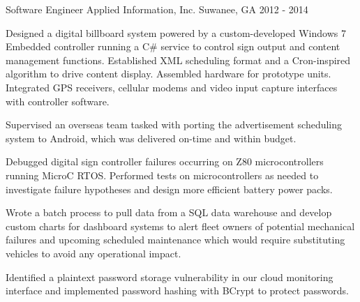 \begin{cventries}
  \cventry
    {Software Engineer} %
    {Applied Information, Inc.} %
    {Suwanee, GA} %
    {2012 - 2014} %
    {
      \begin{cvitems} %
        \item {Designed a digital billboard system powered by a custom-developed Windows 7 Embedded controller running a C# service to control sign output and content management functions. Established XML scheduling format and a Cron-inspired algorithm to drive content display. Assembled hardware for prototype units. Integrated GPS receivers, cellular modems and video input capture interfaces with controller software.}
		\item {Supervised an overseas team tasked with porting the advertisement scheduling system to Android, which was delivered on-time and within budget.}
		\item {Debugged digital sign controller failures occurring on Z80 microcontrollers running MicroC RTOS. Performed tests on microcontrollers as needed to investigate failure hypotheses and design more efficient battery power packs.}
		\item {Wrote a batch process to pull data from a SQL data warehouse and develop custom charts for dashboard systems to alert fleet owners of potential mechanical failures and upcoming scheduled maintenance which would require substituting vehicles to avoid any operational impact.}
		\item {Identified a plaintext password storage vulnerability in our cloud monitoring interface and implemented password hashing with BCrypt to protect passwords.}
      \end{cvitems}
    }


\end{cventries}
